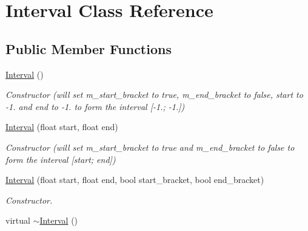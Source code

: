 \hypertarget{classInterval}{\section{Interval Class Reference}
\label{classInterval}
}
\subsection*{Public Member Functions}
\begin{DoxyCompactItemize}
\item 
\hypertarget{classInterval_ae48b9a9e9f672f81977627b609e32429}{\hyperlink{classInterval_ae48b9a9e9f672f81977627b609e32429}{Interval} ()}\label{classInterval_ae48b9a9e9f672f81977627b609e32429}

\begin{DoxyCompactList}\small\item\em Constructor (will set m\+\_\+start\+\_\+bracket to true, m\+\_\+end\+\_\+bracket to false, start to -\/1. and end to -\/1. to form the interval \mbox{[}-\/1.; -\/1.\mbox{]}) \end{DoxyCompactList}\item 
\hyperlink{classInterval_a9aa71152272683ef766b673aee7a4344}{Interval} (float start, float end)
\begin{DoxyCompactList}\small\item\em Constructor (will set m\+\_\+start\+\_\+bracket to true and m\+\_\+end\+\_\+bracket to false to form the interval \mbox{[}start; end\mbox{]}) \end{DoxyCompactList}\item 
\hyperlink{classInterval_a7e77997ff98f395f57de9fdd1975ff43}{Interval} (float start, float end, bool start\+\_\+bracket, bool end\+\_\+bracket)
\begin{DoxyCompactList}\small\item\em Constructor. \end{DoxyCompactList}\item 
\hypertarget{classInterval_a923e1717a3dedfe1ba90f81fcb26d5c5}{virtual \hyperlink{classInterval_a923e1717a3dedfe1ba90f81fcb26d5c5}{$\sim$\+Interval} ()}\label{classInterval_a923e1717a3dedfe1ba90f81fcb26d5c5}


\end{DoxyCompactItemize}
